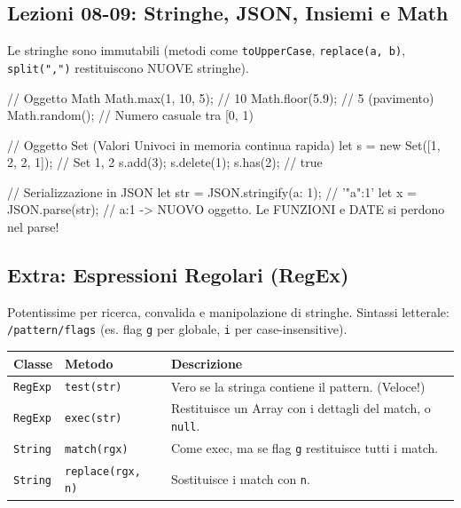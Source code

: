 \documentclass[a4paper,10pt]{article}
\begin{document}
\subsection{Lezioni 08-09: Stringhe, JSON, Insiemi e Math}
Le stringhe sono immutabili (metodi come \texttt{toUpperCase}, \texttt{replace(a, b)}, \texttt{split(",")} restituiscono NUOVE stringhe).

\begin{jsbox}[title={Snippet: Math, Set e JSON}]
// Oggetto Math
Math.max(1, 10, 5); // 10
Math.floor(5.9); // 5 (pavimento)
Math.random(); // Numero casuale tra [0, 1)

// Oggetto Set (Valori Univoci in memoria continua rapida)
let s = new Set([1, 2, 2, 1]); // Set {1, 2}
s.add(3); s.delete(1); s.has(2); // true

// Serializzazione in JSON
let str = JSON.stringify({a: 1}); // '{"a":1}'
let x = JSON.parse(str); // {a:1} -> NUOVO oggetto. Le FUNZIONI e DATE si perdono nel parse!
\end{jsbox}

\subsection{Extra: Espressioni Regolari (RegEx)}
Potentissime per ricerca, convalida e manipolazione di stringhe.
Sintassi letterale: \texttt{/pattern/flags} (es. flag \texttt{g} per globale, \texttt{i} per case-insensitive).

\begin{center}
\renewcommand{\arraystretch}{1.5}
\begin{tabular}{|l|l|l|}
\hline
\textbf{Classe} & \textbf{Metodo} & \textbf{Descrizione} \\
\hline
\texttt{RegExp} & \texttt{test(str)} & Vero se la stringa contiene il pattern. (Veloce!) \\
\hline
\texttt{RegExp} & \texttt{exec(str)} & Restituisce un Array con i dettagli del match, o \texttt{null}. \\
\hline
\texttt{String} & \texttt{match(rgx)} & Come exec, ma se flag \texttt{g} restituisce tutti i match. \\
\hline
\texttt{String} & \texttt{replace(rgx, n)} & Sostituisce i match con \texttt{n}. \\
\hline
\end{tabular}
\end{center}

\end{document}

